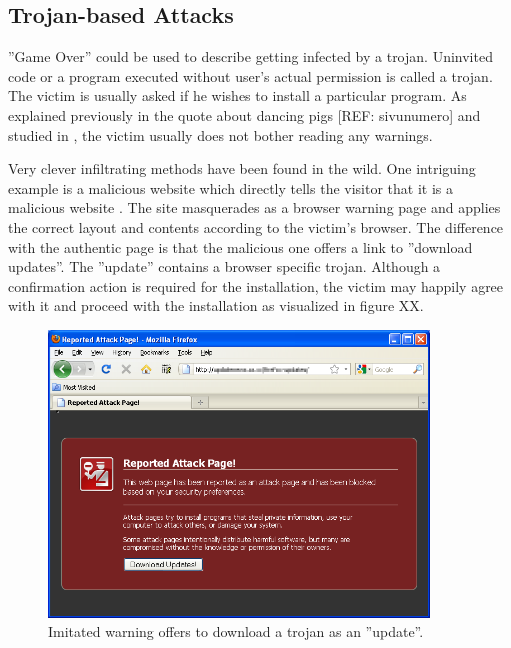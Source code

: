 \documentclass{tktltiki}
\begin{document}
      
    
\subsection{Trojan-based Attacks}

  ''Game Over'' could be used to describe getting infected by a trojan. Uninvited code or a program executed without user's actual permission is called a trojan. The victim is usually asked if he wishes to install a particular program. As explained previously in the quote about dancing pigs [REF: sivunumero] and studied in \cite{why_phishing_works_06}, the victim usually does not bother reading any warnings.

    Very clever infiltrating methods have been found in the wild. One intriguing example is a malicious website which directly tells the visitor that it is a malicious website \cite{fsecure_webtrojan_2010}. The site masquerades as a browser warning page and applies the correct layout and contents according to the victim's browser. The difference with the authentic page is that the malicious one offers a link to ''download updates''. The ''update'' contains a browser specific trojan. Although a confirmation action is required for the installation, the victim may happily agree with it and proceed with the installation as visualized in figure XX. 

        
  \begin{figure}
    \centering
    \includegraphics[width=0.9\textwidth]{images/firefox_reported_attack_page_trojan.png}
    \caption{Imitated warning offers to download a trojan as an ''update''.}
    
    \label{fig:ff_malicious_warning}
  \end{figure}
\end{document}
